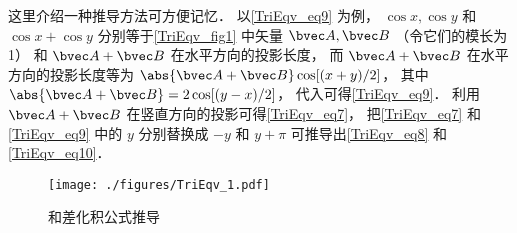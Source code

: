 这里介绍一种推导方法可方便记忆． 以\autoref{TriEqv_eq9} 为例， $\cos x, \cos y$ 和 $\cos x + \cos y$ 分别等于\autoref{TriEqv_fig1} 中矢量 $\bvec A, \bvec B$ （令它们的模长为 1） 和 $\bvec A + \bvec B$ 在水平方向的投影长度， 而 $\bvec A + \bvec B$ 在水平方向的投影长度等为 $\abs{\bvec A + \bvec B}\cos[(x+y)/2]$， 其中 $\abs{\bvec A + \bvec B} = 2\cos [(y-x)/2]$， 代入可得\autoref{TriEqv_eq9}． 利用 $\bvec A + \bvec B$ 在竖直方向的投影可得\autoref{TriEqv_eq7}， 把\autoref{TriEqv_eq7} 和\autoref{TriEqv_eq9} 中的 $y$ 分别替换成 $-y$ 和 $y+\pi$ 可推导出\autoref{TriEqv_eq8} 和\autoref{TriEqv_eq10}．
\begin{figure}[ht]
\centering
\texttt{[image: ./figures/TriEqv\_1.pdf]}
\caption{和差化积公式推导} \label{TriEqv_fig1}
\end{figure}